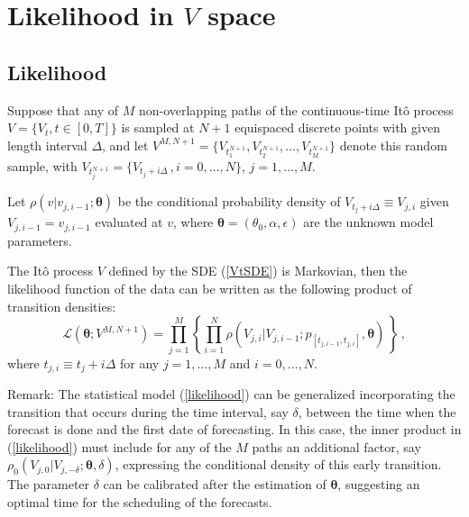 \documentclass[11pt]{article}
\theoremstyle{definition}
\begin{document}

\section{Likelihood in $V$ space} \label{Section_4}

\subsection{Likelihood}

Suppose that any of $M$ non-overlapping paths of the continuous-time It\^{o} process $V = \{ V_t, t  \in [0,T] \}$ is sampled at $N + 1$ equispaced discrete points with given length interval $\Delta$, and let $ V^{M,N + 1}=\{ V_{t_1^{N + 1}} , V_{t_2^{N + 1}} ,\ldots , V_{t_M^{N + 1}} \}$ denote this random sample, with $V_{t_j^{N + 1}} = \{ V_{t_j + i \Delta}\,, i = 0, \ldots, N \}, \, j = 1, \ldots, M$. 

Let $\rho(v \vert v_{j, i-1} ; \bm{\theta})$ be the conditional probability density of $V_{t_j + i \Delta} \equiv V_{j, i}$ given $V_{j, i-1} = v_{j, i-1}$ evaluated at $v$, where $\bm{\theta} = (\theta_0, \alpha, \epsilon)$ are the unknown model parameters.

The It\^{o} process $V$ defined by the SDE (\ref{VtSDE}) is Markovian, then the likelihood function of the data can be written as the following product of transition densities:  
\begin{equation}
\mathcal{L}(\bm{\theta}; V^{M,N +1}) = \prod\limits_{j=1}^M \left\{ \prod\limits_{i=1}^N \rho ( {V_{j, i}| V_{j, i-1}} ; p_{[t_{j,  i-1}, t_{j , i} ]},  \bm{\theta} )  \,  \right\} \,,
\label{likelihood}
\end{equation}
where $t_{j ,i} \equiv  t_j + i \Delta$ for any $j = 1, \ldots, M$ and $i = 0, \ldots, N$.

 {\color{red} Remark: The statistical model (\ref{likelihood}) can be generalized incorporating the transition that occurs during the time interval, say $\delta$, between the time when the forecast is done and the first date of forecasting. In this case, the inner product in  (\ref{likelihood}) must include for any of the $M$ paths an additional factor, say $\rho_0 (V_{j, 0}|V_{j, -\delta};\bm{\theta},\delta)$, expressing the conditional density of this early transition. The parameter $\delta$ can be calibrated after the estimation of $\bm{\theta}$, suggesting an optimal time for the scheduling of the forecasts.}
\end{document}
